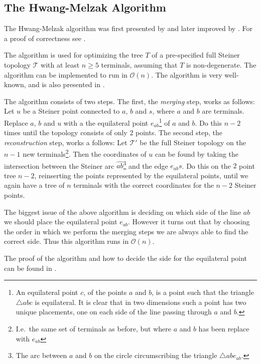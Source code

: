 \subsection{The Hwang-Melzak Algorithm}
\label{sec:hwang-melz-algor}

The Hwang-Melzak algorithm was first presented by \textcite{melzak1961} and
later improved by \textcite{hwang1986hexagonal}. For a proof of correctness see
\textcite{hwang1986linear, melzak1961}.

The algorithm is used for optimizing the tree $T$ of a pre-specified full
Steiner topology $\mathcal{T}$ with at least $n \ge 5$ terminals, assuming that
$T$ is non-degenerate. The algorithm can be implemented to run in
$\mathcal{O}(n)$. The algorithm is very well-known, and is also presented in
\textcite{brazil2015,smith1992}.

The algorithm consists of two steps. The first, the \textit{merging} step, works
as follows: Let $u$ be a Steiner point connected to $a$, $b$ and $s$, where $a$
and $b$ are terminals. Replace $a$, $b$ and $u$ with a the equilateral point
$e_{ab}$\footnote{An equilateral point $c$, of the points $a$ and $b$, is a
  point such that the triangle $\triangle a b c$ is equilateral. It is clear
  that in two dimensions such a point has two unique placements, one on each
  side of the line passing through $a$ and $b$.} of $a$ and $b$. Do this $n-2$
times until the topology consists of only $2$ points. The second step, the
\textit{reconstruction} step, works a follows: Let $\mathcal{T}'$ be the
full Steiner topology on the $n-1$ new terminals\footnote{I.e.\ the same set of terminals as
  before, but where $a$ and $b$ has been replace with $e_{ab}$}. Then the
coordinates of $u$ can be found by taking the intersection between the Steiner
arc $\hat{ab}$\footnote{The arc between $a$ and $b$ on the circle circumscribing
  the triangle $\triangle a b e_{ab}$.} and the edge $e_{ab}s$. Do this on the
$2$ point tree $n-2$, reinserting the points represented by the equilateral
points, until we again have a tree of $n$ terminals with the correct coordinates
for the $n-2$ Steiner points.

The biggest issue of the above algorithm is deciding on which side of the line
$ab$ we should place the equilateral point $e_{ab}$. However it turns out that
by choosing the order in which we perform the merging steps we are always able
to find the correct side. Thus this algorithm runs in $\mathcal{O}(n)$.

The proof of the algorithm and how to decide the side for the equilateral point
can be found in \textcite[ch.~1]{brazil2015}.

